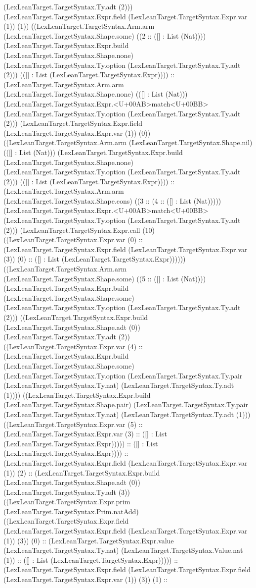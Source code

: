 \documentclass[11pt]{article}
\begin{document}
(LexLeanTarget.TargetSyntax.Ty.adt (2))) (LexLeanTarget.TargetSyntax.Expr.field (LexLeanTarget.TargetSyntax.Expr.var (1)) (1)) ((LexLeanTarget.TargetSyntax.Arm.arm (LexLeanTarget.TargetSyntax.Shape.some) ((2 :: ([] : List (Nat)))) (LexLeanTarget.TargetSyntax.Expr.build (LexLeanTarget.TargetSyntax.Shape.none) (LexLeanTarget.TargetSyntax.Ty.option (LexLeanTarget.TargetSyntax.Ty.adt (2))) (([] : List (LexLeanTarget.TargetSyntax.Expr)))) :: (LexLeanTarget.TargetSyntax.Arm.arm (LexLeanTarget.TargetSyntax.Shape.none) (([] : List (Nat))) (LexLeanTarget.TargetSyntax.Expr.<U+00AB>match<U+00BB> (LexLeanTarget.TargetSyntax.Ty.option (LexLeanTarget.TargetSyntax.Ty.adt (2))) (LexLeanTarget.TargetSyntax.Expr.field (LexLeanTarget.TargetSyntax.Expr.var (1)) (0)) ((LexLeanTarget.TargetSyntax.Arm.arm (LexLeanTarget.TargetSyntax.Shape.nil) (([] : List (Nat))) (LexLeanTarget.TargetSyntax.Expr.build (LexLeanTarget.TargetSyntax.Shape.none) (LexLeanTarget.TargetSyntax.Ty.option (LexLeanTarget.TargetSyntax.Ty.adt (2))) (([] : List (LexLeanTarget.TargetSyntax.Expr)))) :: (LexLeanTarget.TargetSyntax.Arm.arm (LexLeanTarget.TargetSyntax.Shape.cons) ((3 :: (4 :: ([] : List (Nat))))) (LexLeanTarget.TargetSyntax.Expr.<U+00AB>match<U+00BB> (LexLeanTarget.TargetSyntax.Ty.option (LexLeanTarget.TargetSyntax.Ty.adt (2))) (LexLeanTarget.TargetSyntax.Expr.call (10) ((LexLeanTarget.TargetSyntax.Expr.var (0) :: (LexLeanTarget.TargetSyntax.Expr.field (LexLeanTarget.TargetSyntax.Expr.var (3)) (0) :: ([] : List (LexLeanTarget.TargetSyntax.Expr)))))) ((LexLeanTarget.TargetSyntax.Arm.arm (LexLeanTarget.TargetSyntax.Shape.some) ((5 :: ([] : List (Nat)))) (LexLeanTarget.TargetSyntax.Expr.build (LexLeanTarget.TargetSyntax.Shape.some) (LexLeanTarget.TargetSyntax.Ty.option (LexLeanTarget.TargetSyntax.Ty.adt (2))) ((LexLeanTarget.TargetSyntax.Expr.build (LexLeanTarget.TargetSyntax.Shape.adt (0)) (LexLeanTarget.TargetSyntax.Ty.adt (2)) ((LexLeanTarget.TargetSyntax.Expr.var (4) :: (LexLeanTarget.TargetSyntax.Expr.build (LexLeanTarget.TargetSyntax.Shape.some) (LexLeanTarget.TargetSyntax.Ty.option (LexLeanTarget.TargetSyntax.Ty.pair (LexLeanTarget.TargetSyntax.Ty.nat) (LexLeanTarget.TargetSyntax.Ty.adt (1)))) ((LexLeanTarget.TargetSyntax.Expr.build (LexLeanTarget.TargetSyntax.Shape.pair) (LexLeanTarget.TargetSyntax.Ty.pair (LexLeanTarget.TargetSyntax.Ty.nat) (LexLeanTarget.TargetSyntax.Ty.adt (1))) ((LexLeanTarget.TargetSyntax.Expr.var (5) :: (LexLeanTarget.TargetSyntax.Expr.var (3) :: ([] : List (LexLeanTarget.TargetSyntax.Expr))))) :: ([] : List (LexLeanTarget.TargetSyntax.Expr)))) :: (LexLeanTarget.TargetSyntax.Expr.field (LexLeanTarget.TargetSyntax.Expr.var (1)) (2) :: (LexLeanTarget.TargetSyntax.Expr.build (LexLeanTarget.TargetSyntax.Shape.adt (0)) (LexLeanTarget.TargetSyntax.Ty.adt (3)) ((LexLeanTarget.TargetSyntax.Expr.prim (LexLeanTarget.TargetSyntax.Prim.natAdd) ((LexLeanTarget.TargetSyntax.Expr.field (LexLeanTarget.TargetSyntax.Expr.field (LexLeanTarget.TargetSyntax.Expr.var (1)) (3)) (0) :: (LexLeanTarget.TargetSyntax.Expr.value (LexLeanTarget.TargetSyntax.Ty.nat) (LexLeanTarget.TargetSyntax.Value.nat (1)) :: ([] : List (LexLeanTarget.TargetSyntax.Expr))))) :: (LexLeanTarget.TargetSyntax.Expr.field (LexLeanTarget.TargetSyntax.Expr.field (LexLeanTarget.TargetSyntax.Expr.var (1)) (3)) (1) :: 
\end{document}
